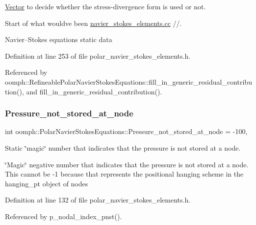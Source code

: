 \hyperlink{classoomph_1_1Vector}{Vector} to decide whether the stress-\/divergence form is used or not. 

Start of what would\textquotesingle{}ve been \hyperlink{navier__stokes__elements_8cc}{navier\+\_\+stokes\+\_\+elements.\+cc} //.

Navier--Stokes equations static data 

Definition at line 253 of file polar\+\_\+navier\+\_\+stokes\+\_\+elements.\+h.



Referenced by oomph\+::\+Refineable\+Polar\+Navier\+Stokes\+Equations\+::fill\+\_\+in\+\_\+generic\+\_\+residual\+\_\+contribution(), and fill\+\_\+in\+\_\+generic\+\_\+residual\+\_\+contribution().

\mbox{\label{classoomph_1_1PolarNavierStokesEquations_a8fbf3013addd48f0017c92c5be561f0a}} 
\subsubsection{\texorpdfstring{Pressure\+\_\+not\+\_\+stored\+\_\+at\+\_\+node}{Pressure\_not\_stored\_at\_node}}
{\footnotesize\ttfamily int oomph\+::\+Polar\+Navier\+Stokes\+Equations\+::\+Pressure\+\_\+not\+\_\+stored\+\_\+at\+\_\+node = -\/100\hspace{0.3cm}{\ttfamily [static]}, {\ttfamily [private]}}



Static \char`\"{}magic\char`\"{} number that indicates that the pressure is not stored at a node. 

\char`\"{}\+Magic\char`\"{} negative number that indicates that the pressure is not stored at a node. This cannot be -\/1 because that represents the positional hanging scheme in the hanging\+\_\+pt object of nodes 

Definition at line 132 of file polar\+\_\+navier\+\_\+stokes\+\_\+elements.\+h.



Referenced by p\+\_\+nodal\+\_\+index\+\_\+pnst().

